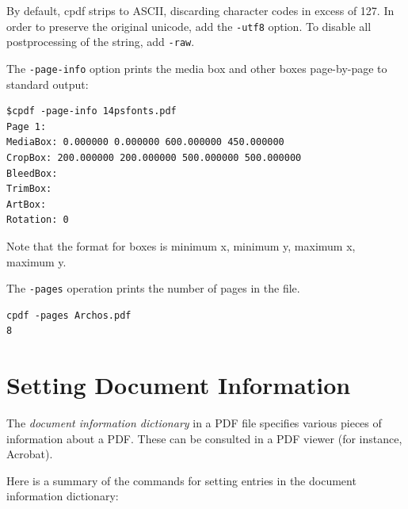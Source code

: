 \documentclass[a4paper,makeidx]{memoir}
\newcommand{\smallgap}{\vspace{4mm}}
\begin{document}
By default, cpdf strips to ASCII, discarding character codes in excess of 127. In order to preserve the original unicode, add the \texttt{-utf8} option. To disable all postprocessing of the string, add \texttt{-raw}.

\vspace{4mm}
The \texttt{-page-info} option prints the media box and other boxes
page-by-page to standard output:

\begin{framed}
\begin{verbatim}
$cpdf -page-info 14psfonts.pdf
Page 1:
MediaBox: 0.000000 0.000000 600.000000 450.000000
CropBox: 200.000000 200.000000 500.000000 500.000000
BleedBox: 
TrimBox: 
ArtBox:
Rotation: 0
\end{verbatim}
\end{framed}

\noindent Note that the format for boxes is minimum x, minimum y, maximum x, maximum y.

\smallgap 
\noindent The \texttt{-pages} operation prints the number of pages in the file.
\begin{framed}
\begin{verbatim}
cpdf -pages Archos.pdf
8
\end{verbatim}
\end{framed}

\section{Setting Document Information}
\label{setdocinfo}
  The \textit{document information dictionary} in a PDF file specifies various
pieces of information about a PDF. These can be consulted in a PDF viewer (for
instance, Acrobat).

  Here is a summary of the commands for setting entries in the document
information dictionary:
\end{document}
